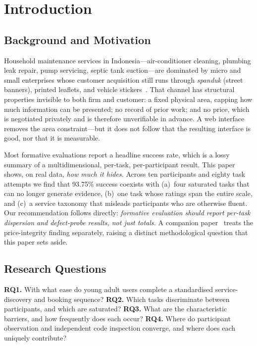 \documentclass[conference]{IEEEtran}
\begin{document}
\section{Introduction}
\label{sec:intro}

\subsection{Background and Motivation}

Household maintenance services in Indonesia---air-conditioner cleaning,
plumbing leak repair, pump servicing, septic tank suction---are dominated
by micro and small enterprises whose customer acquisition still runs
through \emph{spanduk} (street banners), printed leaflets, and vehicle
stickers~\cite{tianti}. That channel has structural properties invisible
to both firm and customer: a fixed physical area, capping how much
information can be presented; no record of prior work; and no price, which
is negotiated privately and is therefore unverifiable in advance. A web
interface removes the area constraint---but it does not follow that the
resulting interface is good, nor that it is measurable.

Most formative evaluations report a headline success rate, which is a
lossy summary of a multidimensional, per-task, per-participant result.
This paper shows, on real data, \emph{how much it hides.} Across ten
participants and eighty task attempts we find that 93.75\% success
coexists with (a)~four saturated tasks that can no longer generate
evidence, (b)~one task whose ratings span the entire scale, and (c)~a
service taxonomy that misleads participants who are otherwise fluent. Our
recommendation follows directly: \emph{formative evaluation should report
per-task dispersion and defect-probe results, not just totals.} A companion
paper~\cite{braniwati} treats the price-integrity finding separately,
raising a distinct methodological question that this paper sets aside.

\subsection{Research Questions}

\textbf{RQ1.} With what ease do young adult users complete a standardised
service-discovery and booking sequence? \textbf{RQ2.} Which tasks
discriminate between participants, and which are saturated? \textbf{RQ3.}
What are the characteristic barriers, and how frequently does each occur?
\textbf{RQ4.} Where do participant observation and independent code
inspection converge, and where does each uniquely contribute?
\end{document}
